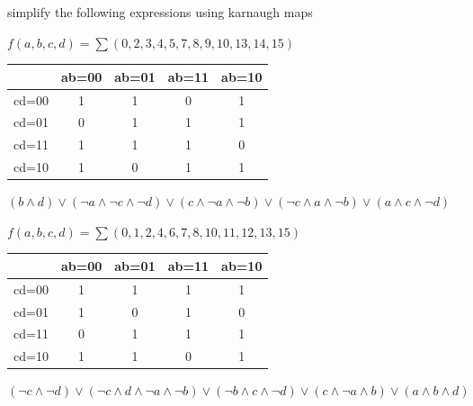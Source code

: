 \documentclass[a4paper,12pt]{article}
\begin{document}
\newenvironment{note}
  {\begin{bclogo}[logo=\bcinfo, couleurBarre=orange, couleur=lightgray]{ note}}
  {\end{bclogo}}
\newenvironment{attention}
  {\begin{bclogo}[logo=\bcattention, couleurBarre=red, noborder=true, 
                couleur=red!15]{Important!}}
  {\end{bclogo}}

\begin{question}
simplify the following expressions using karnaugh maps\\[0pt]

\begin{subquestion}
\(f(a,b,c,d)=\sum{(0,2,3,4,5,7,8,9,10,13,14,15)}\)\\[0pt]
\begin{answer}
\begin{tabular}{ c|c|c|c|c }
  & ab=00 & ab=01 & ab=11 & ab=10\\
  \hline
  cd=00 & 1 & 1 & 0 & 1\\
  cd=01 & 0 & 1 & 1 & 1\\
  cd=11 & 1 & 1 & 1 & 0\\
  cd=10 & 1 & 0 & 1 & 1
\end{tabular}
\((b \land d) \lor (\lnot a \land \lnot c \land \lnot d) \lor (c \land \lnot a \land \lnot b) \lor (\lnot c \land a \land \lnot b) \lor (a \land c \land \lnot d)\)\\[0pt]
\end{answer}
\end{subquestion}

\begin{subquestion}
\(f(a,b,c,d)=\sum{(0,1,2,4,6,7,8,10,11,12,13,15)}\)\\[0pt]
\begin{answer}
\begin{tabular}{ c|c|c|c|c }
  & ab=00 & ab=01 & ab=11 & ab=10\\
  \hline
  cd=00 & 1 & 1 & 1 & 1\\
  cd=01 & 1 & 0 & 1 & 0\\
  cd=11 & 0 & 1 & 1 & 1\\
  cd=10 & 1 & 1 & 0 & 1
\end{tabular}
\((\lnot c \land \lnot d) \lor (\lnot c \land d \land \lnot a \land \lnot b) \lor (\lnot b \land c \land \lnot d) \lor (c \land \lnot a \land b) \lor (a \land b \land d)\)\\[0pt]
\end{answer}
\end{subquestion}


\end{question}
\end{document}
